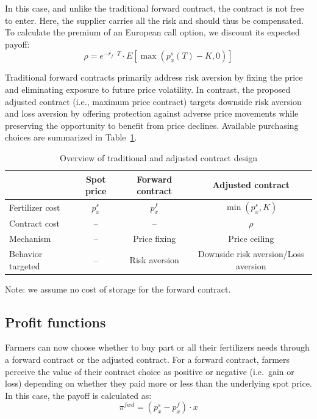 \documentclass[12pt,a4paper]{article}
\begin{document}
In this case, and unlike the traditional forward contract, the contract is not free to enter. Here, the supplier carries all the risk and should thus be compensated. To calculate the premium of an European call option, we discount its expected payoff:
\begin{equation}
\rho = e^{-r_f \cdot T} \cdot E[\max(p_x^s(T) - K, 0)]
\label{eq:premium}
\end{equation}

Traditional forward contracts primarily address risk aversion by fixing the price and eliminating exposure to future price volatility. In contrast, the proposed adjusted contract (i.e., maximum price contract) targets downside risk aversion and loss aversion by offering protection against adverse price movements while preserving the opportunity to benefit from price declines. Available purchasing choices are summarized in Table~\ref{tab:contract_design}.

\begin{table}[H]
\centering
\caption{Overview of traditional and adjusted contract design}
\label{tab:contract_design}
\begin{tabular}{lccc}
\toprule
 & Spot price & Forward contract & Adjusted contract \\
\midrule
Fertilizer cost & $p_x^s$ & $p_x^f$ & $\min(p_x^s, K)$ \\
Contract cost & -- & -- & $\rho$ \\
Mechanism & -- & Price fixing & Price ceiling \\
Behavior targeted & -- & Risk aversion & Downside risk aversion/Loss aversion \\
\bottomrule
\end{tabular}

\smallskip
\footnotesize Note: we assume no cost of storage for the forward contract.
\end{table}

\subsection{Profit functions}

Farmers can now choose whether to buy part or all their fertilizers needs through a forward contract or the adjusted contract. For a forward contract, farmers perceive the value of their contract choice as positive or negative (i.e.\ gain or loss) depending on whether they paid more or less than the underlying spot price. In this case, the payoff is calculated as:
\begin{equation}
\pi^{fwd} = (p_x^s - p_x^f) \cdot x
\label{eq:fwd_payoff}
\end{equation}
\end{document}
